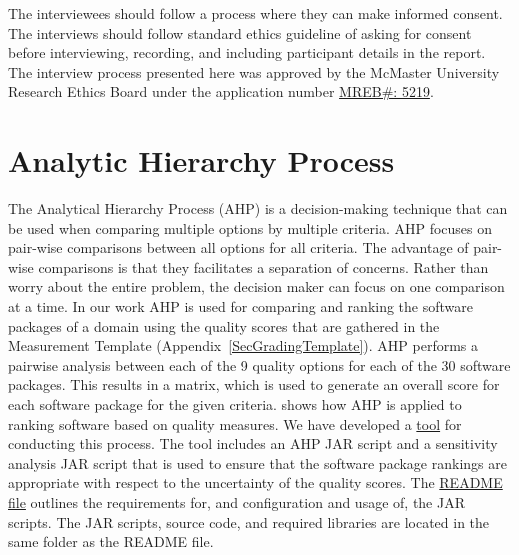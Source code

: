 \documentclass[letterpaper,cleveref]{lipics-v2019}
\begin{document}
The interviewees should follow a process where they can make informed consent.
The interviews should follow standard ethics guideline of asking for consent
before interviewing, recording, and including participant details in the report.
The interview process presented here was approved by the McMaster University
Research Ethics Board under the application number 
\href{https://github.com/smiths/AIMSS/blob/master/StateOfPractice/MACREM/Application.pdf}
{MREB\#: 5219}.

\section{Analytic Hierarchy Process} \label{SecAHP}

The Analytical Hierarchy Process (AHP) is a decision-making technique that can
be used when comparing multiple options by multiple criteria. AHP focuses on
pair-wise comparisons between all options for all criteria.  The advantage of
pair-wise comparisons is that they facilitates a separation of concerns.  Rather
than worry about the entire problem, the decision maker can focus on one
comparison at a time.  In our work AHP is used for comparing and ranking the
software packages of a domain using the quality scores that are gathered in the
Measurement Template (Appendix~\ref{SecGradingTemplate}). AHP performs a
pairwise analysis between each of the 9 quality options for each of the 30
software packages.  This results in a matrix, which is used to generate an
overall score for each software package for the given criteria.
\cite{SmithEtAl2016} shows how AHP is applied to ranking software based on
quality measures. We have developed a
\href{https://github.com/smiths/AIMSS/blob/master/StateOfPractice/AHP2020/LBM/README.txt}{tool}
for conducting this process. The tool includes an AHP JAR script and a
sensitivity analysis JAR script that is used to ensure that the software package
rankings are appropriate with respect to the uncertainty of the quality scores.
The
\href{https://github.com/smiths/AIMSS/blob/master/StateOfPractice/AHP2020/LBM/README.txt}{README
file} outlines the requirements for, and configuration and usage of, the JAR
scripts. The JAR scripts, source code, and required libraries are located in the
same folder as the README file.

\end{document}
